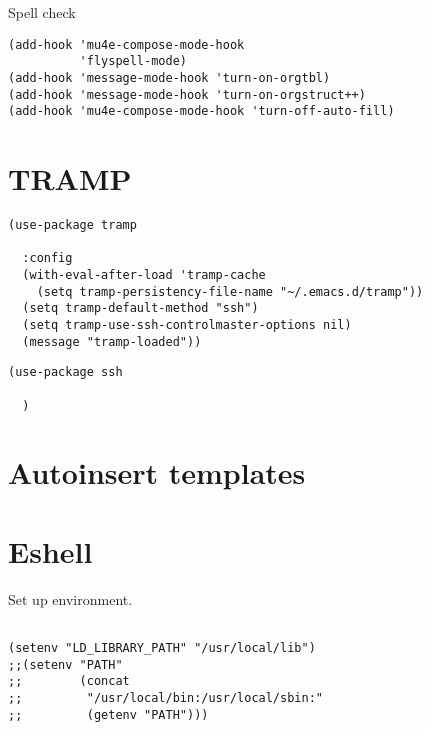 \documentclass[12pt]{article}
\begin{document}
Spell check

\begin{verbatim}
(add-hook 'mu4e-compose-mode-hook
          'flyspell-mode)
(add-hook 'message-mode-hook 'turn-on-orgtbl)
(add-hook 'message-mode-hook 'turn-on-orgstruct++)
(add-hook 'mu4e-compose-mode-hook 'turn-off-auto-fill)
\end{verbatim}

\section{TRAMP}
\label{sec:org7026cc5}

\begin{verbatim}
(use-package tramp

  :config
  (with-eval-after-load 'tramp-cache
    (setq tramp-persistency-file-name "~/.emacs.d/tramp"))
  (setq tramp-default-method "ssh")
  (setq tramp-use-ssh-controlmaster-options nil)
  (message "tramp-loaded"))
\end{verbatim}

\begin{verbatim}
(use-package ssh

  )
\end{verbatim}

\section{Autoinsert templates}
\label{sec:org3810678}

\section{Eshell}
\label{sec:org4386622}

Set up environment.
\begin{verbatim}

(setenv "LD_LIBRARY_PATH" "/usr/local/lib")
;;(setenv "PATH"
;;        (concat
;;         "/usr/local/bin:/usr/local/sbin:"
;;         (getenv "PATH")))

\end{verbatim}
\end{document}
